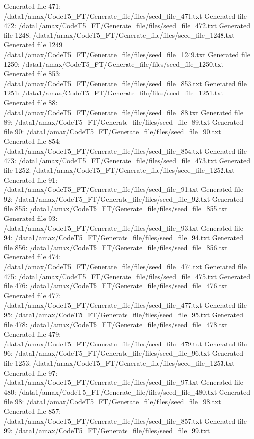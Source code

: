 Generated file 471: /data1/amax/CodeT5_FT/Generate_file/files/seed_file_471.txt
Generated file 472: /data1/amax/CodeT5_FT/Generate_file/files/seed_file_472.txt
Generated file 1248: /data1/amax/CodeT5_FT/Generate_file/files/seed_file_1248.txt
Generated file 1249: /data1/amax/CodeT5_FT/Generate_file/files/seed_file_1249.txt
Generated file 1250: /data1/amax/CodeT5_FT/Generate_file/files/seed_file_1250.txt
Generated file 853: /data1/amax/CodeT5_FT/Generate_file/files/seed_file_853.txt
Generated file 1251: /data1/amax/CodeT5_FT/Generate_file/files/seed_file_1251.txt
Generated file 88: /data1/amax/CodeT5_FT/Generate_file/files/seed_file_88.txt
Generated file 89: /data1/amax/CodeT5_FT/Generate_file/files/seed_file_89.txt
Generated file 90: /data1/amax/CodeT5_FT/Generate_file/files/seed_file_90.txt
Generated file 854: /data1/amax/CodeT5_FT/Generate_file/files/seed_file_854.txt
Generated file 473: /data1/amax/CodeT5_FT/Generate_file/files/seed_file_473.txt
Generated file 1252: /data1/amax/CodeT5_FT/Generate_file/files/seed_file_1252.txt
Generated file 91: /data1/amax/CodeT5_FT/Generate_file/files/seed_file_91.txt
Generated file 92: /data1/amax/CodeT5_FT/Generate_file/files/seed_file_92.txt
Generated file 855: /data1/amax/CodeT5_FT/Generate_file/files/seed_file_855.txt
Generated file 93: /data1/amax/CodeT5_FT/Generate_file/files/seed_file_93.txt
Generated file 94: /data1/amax/CodeT5_FT/Generate_file/files/seed_file_94.txt
Generated file 856: /data1/amax/CodeT5_FT/Generate_file/files/seed_file_856.txt
Generated file 474: /data1/amax/CodeT5_FT/Generate_file/files/seed_file_474.txt
Generated file 475: /data1/amax/CodeT5_FT/Generate_file/files/seed_file_475.txt
Generated file 476: /data1/amax/CodeT5_FT/Generate_file/files/seed_file_476.txt
Generated file 477: /data1/amax/CodeT5_FT/Generate_file/files/seed_file_477.txt
Generated file 95: /data1/amax/CodeT5_FT/Generate_file/files/seed_file_95.txt
Generated file 478: /data1/amax/CodeT5_FT/Generate_file/files/seed_file_478.txt
Generated file 479: /data1/amax/CodeT5_FT/Generate_file/files/seed_file_479.txt
Generated file 96: /data1/amax/CodeT5_FT/Generate_file/files/seed_file_96.txt
Generated file 1253: /data1/amax/CodeT5_FT/Generate_file/files/seed_file_1253.txt
Generated file 97: /data1/amax/CodeT5_FT/Generate_file/files/seed_file_97.txt
Generated file 480: /data1/amax/CodeT5_FT/Generate_file/files/seed_file_480.txt
Generated file 98: /data1/amax/CodeT5_FT/Generate_file/files/seed_file_98.txt
Generated file 857: /data1/amax/CodeT5_FT/Generate_file/files/seed_file_857.txt
Generated file 99: /data1/amax/CodeT5_FT/Generate_file/files/seed_file_99.txt
